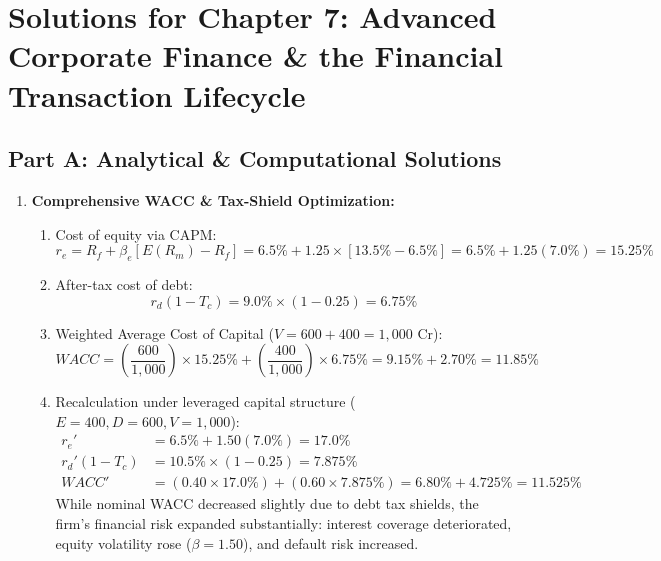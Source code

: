 \newpage
\section*{Solutions for Chapter 7: Advanced Corporate Finance \& the Financial Transaction Lifecycle}

\subsection*{Part A: Analytical \& Computational Solutions}

\begin{enumerate}[label=\textbf{P7.\arabic*}]
    \item \textbf{Comprehensive WACC \& Tax-Shield Optimization:}
    \begin{enumerate}[label=(\alph*)]
        \item Cost of equity via CAPM:
        \begin{equation*}
        r_e = R_f + \beta_e [E(R_m) - R_f] = 6.5\% + 1.25 \times [13.5\% - 6.5\%] = 6.5\% + 1.25(7.0\%) = \mathbf{15.25\%}
        \end{equation*}
        \item After-tax cost of debt:
        \begin{equation*}
        r_d(1 - T_c) = 9.0\% \times (1 - 0.25) = \mathbf{6.75\%}
        \end{equation*}
        \item Weighted Average Cost of Capital ($V = 600 + 400 = 1{,}000\text{ Cr}$):
        \begin{equation*}
        WACC = \left(\frac{600}{1{,}000}\right) \times 15.25\% + \left(\frac{400}{1{,}000}\right) \times 6.75\% = 9.15\% + 2.70\% = \mathbf{11.85\%}
        \end{equation*}
        \item Recalculation under leveraged capital structure ($E = 400, D = 600, V = 1{,}000$):
        \begin{align*}
        r_e' &= 6.5\% + 1.50(7.0\%) = 17.0\% \\
        r_d'(1 - T_c) &= 10.5\% \times (1 - 0.25) = 7.875\% \\
        WACC' &= (0.40 \times 17.0\%) + (0.60 \times 7.875\%) = 6.80\% + 4.725\% = \mathbf{11.525\%}
        \end{align*}
        While nominal WACC decreased slightly due to debt tax shields, the firm's financial risk expanded substantially: interest coverage deteriorated, equity volatility rose ($\beta = 1.50$), and default risk increased.
    \end{enumerate}


\end{enumerate}
